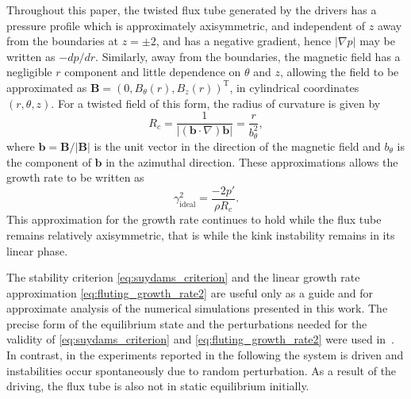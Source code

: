 \documentclass[fleqn,usenatbib]{mnras}
\newcommand{\rs}[2]{{#2}}
\renewcommand{\vec}[1]{{\bm #1}}
\begin{document}
Throughout this \rs{chapter}{paper}, the twisted flux tube generated by the drivers has a pressure profile which is approximately axisymmetric, and independent of $z$ away from the boundaries at $z=\pm2$, and has a negative gradient, hence $|\nabla p|$ may be written as $-d p/ dr$. Similarly, away from the boundaries, the magnetic field has a negligible $r$ component and little dependence on $\theta$ and $z$, allowing the field to be approximated as $\vec{B} = (0, B_{\theta}(r), B_z(r))^{\text{T}}$, in cylindrical coordinates $(r, \theta, z)$. For a twisted field of this form, the radius of curvature is given by 
\begin{equation}
  \label{eq:radius_of_curvature}
  R_c = \frac{1}{|(\vec{b}\cdot\nabla) \vec{b}|} = \frac{r}{b_{\theta}^2},
\end{equation}
where $\vec{b} = \vec{B}/|\vec{B}|$ is the unit vector in the direction of the magnetic field and $b_{\theta}$ is the component of $\vec{b}$ in the azimuthal direction. These approximations allows the growth rate to be written as
\begin{equation}
  \label{eq:fluting_growth_rate2}
\gamma_{\rs{{ideal}}{\text{ideal}}}^2 = \frac{-2p'}{\rho R_c}.
\end{equation}
This \rs{growth rate remains applicable}{approximation for the growth rate continues to hold} while the flux tube remains relatively axisymmetric, that is while the kink instability remains in its linear phase.

\rs{In contrast to the precise form of the equilibrium state and
  perturbation studied in~\citet{quinnEffectAnisotropicViscosity2020},
  this is an experiment where a system is driven and instabilities
  occur organically as a result of noise providing a random
  perturbation. As a result of the driving, the flux tube is not in
  static equilibrium. Consequently, the stability criterion and linear
  growth rate presented previously are useful only as a guide and for
  approximate comparison.}{The stability criterion
  \eqref{eq:suydams_criterion} and the linear
  growth rate approximation \eqref{eq:fluting_growth_rate2} are useful
  only as a guide and for 
  approximate analysis of the numerical simulations presented in this
  work.  The precise form of the equilibrium state and the
  perturbations needed for the validity of
  \eqref{eq:suydams_criterion} and \eqref{eq:fluting_growth_rate2}
  were used in~\citet{quinnEffectAnisotropicViscosity2020}.
  In contrast, in the experiments reported in the following the system
  is driven and instabilities occur spontaneously due to random
  perturbation. As a result of the driving, the flux tube is also not
  in static equilibrium initially. }
\end{document}
